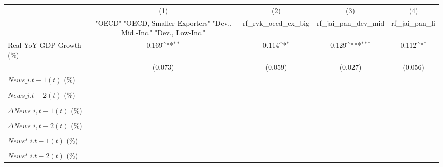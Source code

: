{
\def\sym#1{\ifmmode^{#1}\else\(^{#1}\)\fi}
\begin{tabular}{l*{4}{c}}
\toprule
                    &\multicolumn{1}{c}{(1)}&\multicolumn{1}{c}{(2)}&\multicolumn{1}{c}{(3)}&\multicolumn{1}{c}{(4)}\\
                    &\multicolumn{1}{c}{ "OECD" "OECD, Smaller Exporters" "Dev., Mid.-Inc." "Dev., Low-Inc."}&\multicolumn{1}{c}{rf\_rvk\_oecd\_ex\_big}&\multicolumn{1}{c}{rf\_jai\_pan\_dev\_mid}&\multicolumn{1}{c}{rf\_jai\_pan\_li}\\
\midrule
Real YoY GDP Growth (\%)&       0.169\sym{**} &       0.114\sym{*}  &       0.129\sym{***}&       0.112\sym{*}  \\
                    &     (0.073)         &     (0.059)         &     (0.027)         &     (0.056)         \\
\addlinespace
$ News\_{i.t-1}(t)$ (\%)&                     &                     &                     &                     \\
                    &                     &                     &                     &                     \\
\addlinespace
$ News\_{i.t-2}(t)$ (\%)&                     &                     &                     &                     \\
                    &                     &                     &                     &                     \\
\addlinespace
$ \Delta News\_{i,t-1}(t)$ (\%)&                     &                     &                     &                     \\
                    &                     &                     &                     &                     \\
\addlinespace
$ \Delta News\_{i,t-2}(t)$ (\%)&                     &                     &                     &                     \\
                    &                     &                     &                     &                     \\
\addlinespace
$ News^s\_{i.t-1}(t)$ (\%)&                     &                     &                     &                     \\
                    &                     &                     &                     &                     \\
\addlinespace
$ News^s\_{i.t-2}(t)$ (\%)&                     &                     &                     &                     \\

\end{tabular}}
